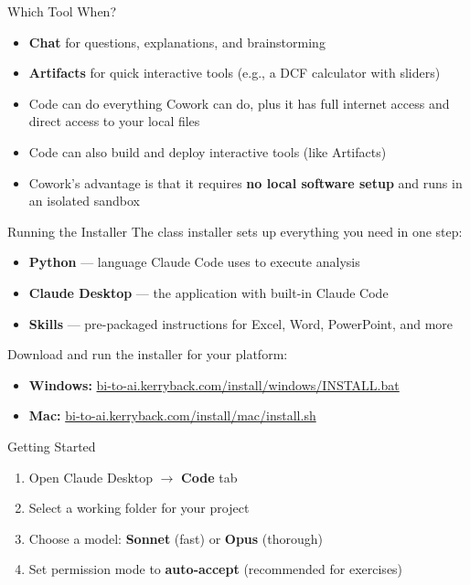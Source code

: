 \documentclass[aspectratio=169]{beamer}
\begin{document}
\begin{frame}{Which Tool When?}
\begin{itemize}
  \item \textbf{Chat} for questions, explanations, and brainstorming
  \item \textbf{Artifacts} for quick interactive tools (e.g., a DCF calculator with sliders)
  \item Code can do everything Cowork can do, plus it has \alert{full internet access} and direct access to your local files
  \item Code can also build and deploy interactive tools (like Artifacts)
  \item Cowork's advantage is that it requires \textbf{no local software setup} and runs in an isolated sandbox
\end{itemize}
\end{frame}

\begin{frame}{Running the Installer}
The class installer sets up everything you need in one step:
\vspace{0.3cm}
\begin{itemize}
  \item \textbf{Python} --- language Claude Code uses to execute analysis
  \item \textbf{Claude Desktop} --- the application with built-in Claude Code
  \item \textbf{Skills} --- pre-packaged instructions for Excel, Word, PowerPoint, and more
\end{itemize}
\vspace{0.3cm}
Download and run the installer for your platform:
\begin{itemize}
  \item \textbf{Windows:} \href{https://bi-to-ai.kerryback.com/install/windows/INSTALL.bat}{bi-to-ai.kerryback.com/install/windows/INSTALL.bat}
  \item \textbf{Mac:} \href{https://bi-to-ai.kerryback.com/install/mac/install.sh}{bi-to-ai.kerryback.com/install/mac/install.sh}
\end{itemize}
\end{frame}

\begin{frame}{Getting Started}
\begin{enumerate}
  \item Open Claude Desktop $\rightarrow$ \textbf{Code} tab
  \item Select a working folder for your project
  \item Choose a model: \textbf{Sonnet} (fast) or \textbf{Opus} (thorough)
  \item Set permission mode to \textbf{auto-accept} (recommended for exercises)
\end{enumerate}
\end{frame}
\end{document}
